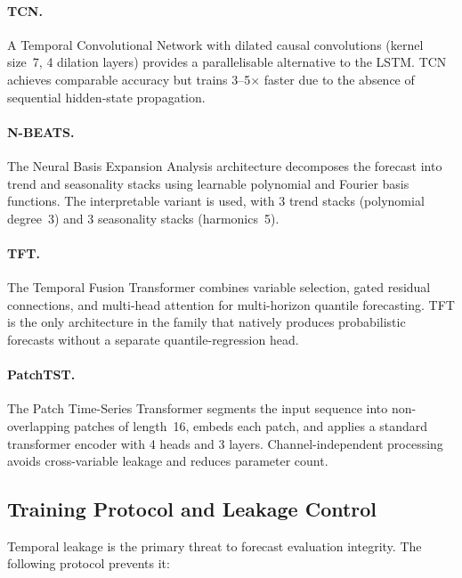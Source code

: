 \paragraph{TCN.}
A Temporal Convolutional Network with dilated causal convolutions
(kernel size~7, 4 dilation layers) provides a parallelisable alternative
to the LSTM.  TCN achieves comparable accuracy but trains 3--5$\times$
faster due to the absence of sequential hidden-state propagation.

\paragraph{N-BEATS.}
The Neural Basis Expansion Analysis architecture decomposes the forecast
into trend and seasonality stacks using learnable polynomial and Fourier
basis functions.  The interpretable variant is used, with 3 trend stacks
(polynomial degree~3) and 3 seasonality stacks (harmonics~5).

\paragraph{TFT.}
The Temporal Fusion Transformer combines variable selection, gated residual
connections, and multi-head attention for multi-horizon quantile forecasting.
TFT is the only architecture in the family that natively produces
probabilistic forecasts without a separate quantile-regression head.

\paragraph{PatchTST.}
The Patch Time-Series Transformer segments the input sequence into
non-overlapping patches of length~16, embeds each patch, and applies a
standard transformer encoder with 4 heads and 3 layers.
Channel-independent processing avoids cross-variable leakage and reduces
parameter count.

\subsection{Training Protocol and Leakage Control}
\label{sec:training-protocol}

Temporal leakage is the primary threat to forecast evaluation integrity.
The following protocol prevents it:

